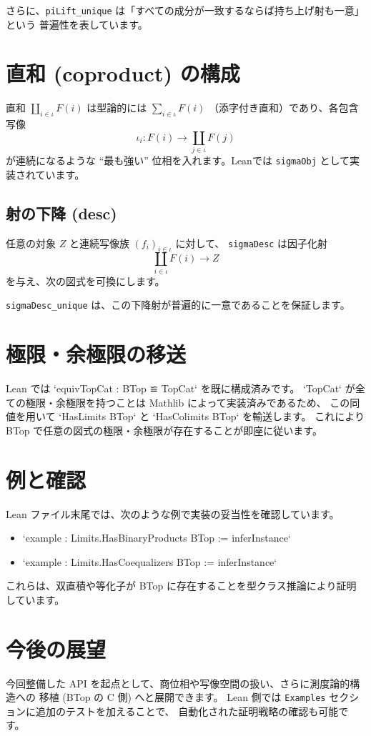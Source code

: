 \documentclass[a4paper]{ltjsarticle}
\begin{document}
さらに、\verb|piLift_unique| は「すべての成分が一致するならば持ち上げ射も一意」という
普遍性を表しています。

\section{直和 (coproduct) の構成}
直和 $\coprod_{i\in\iota} F(i)$ は型論的には $\sum_{i\in\iota} F(i)$
（添字付き直和）であり、各包含写像
\[
\iota_i\colon F(i) \longrightarrow \coprod_{j\in\iota} F(j)
\]
が連続になるような ``最も強い'' 位相を入れます。Leanでは \verb|sigmaObj|
として実装されています。

\subsection{射の下降 (desc)}
任意の対象 $Z$ と連続写像族 $(f_i)_{i\in\iota}$ に対して、
\verb|sigmaDesc| は因子化射
\[
\coprod_{i\in\iota} F(i) \longrightarrow Z
\]
を与え、次の図式を可換にします。

\begin{center}
\end{center}

\verb|sigmaDesc_unique| は、この下降射が普遍的に一意であることを保証します。

\section{極限・余極限の移送}
Lean では `equivTopCat : BTop ≌ TopCat` を既に構成済みです。
`TopCat` が全ての極限・余極限を持つことは Mathlib によって実装済みであるため、
この同値を用いて `HasLimits BTop` と `HasColimits BTop` を輸送します。
これにより BTop で任意の図式の極限・余極限が存在することが即座に従います。

\section{例と確認}
Lean ファイル末尾では、次のような例で実装の妥当性を確認しています。
\begin{itemize}[nosep]
  \item `example : Limits.HasBinaryProducts BTop := inferInstance`
  \item `example : Limits.HasCoequalizers BTop := inferInstance`
\end{itemize}
これらは、双直積や等化子が BTop に存在することを型クラス推論により証明しています。

\section{今後の展望}
今回整備した API を起点として、商位相や写像空間の扱い、さらに測度論的構造への
移植 (BTop の C 側) へと展開できます。
Lean 側では \verb|Examples| セクションに追加のテストを加えることで、
自動化された証明戦略の確認も可能です。
\end{document}
